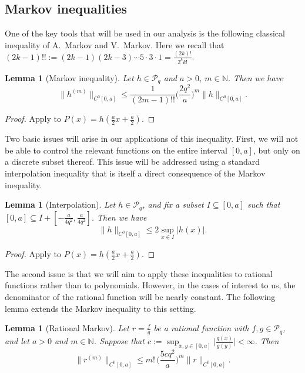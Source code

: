 \documentclass[10pt,reqno]{amsart}
\newtheorem{lem}[thm]{Lemma}
\theoremstyle{definition}
\theoremstyle{remark}
\numberwithin{equation}{section}
\numberwithin{figure}{section}
\numberwithin{table}{section}
\begin{document}
\subsection{Markov inequalities}

One of the key tools that will be used in our analysis is the following
classical inequality of A.\ Markov and V.\ Markov. Here we recall that
$(2k-1)!!:=(2k-1)(2k-3)\cdots 5\cdot 3\cdot 1 =\frac{(2k)!}{2^k k!}$.

\begin{lem}[Markov inequality]
\label{lem:markov}
Let $h\in\mathcal{P}_q$ and $a>0$, $m\in\mathbb{N}$. Then we have
$$
        \|h^{(m)}\|_{C^0[0,a]}
        \le \frac{1}{(2m-1)!!} 
        \bigg(\frac{2q^2}{a}\bigg)^m
	\|h\|_{C^0[0,a]}.
$$
\end{lem}

\begin{proof}
Apply \cite[p.\ 256(d)]{BE95} to
$P(x)=h(\frac{a}{2}x + \frac{a}{2})$.
\end{proof}

Two basic issues will arise in our applications of this inequality. First, 
we will not be able to control the relevant functions on the entire 
interval $[0,a]$, but only on a discrete subset thereof. This issue 
will be addressed using a standard interpolation inequality that is itself 
a direct consequence of the Markov inequality.

\begin{lem}[Interpolation]
\label{lem:interpol}
Let $h\in\mathcal{P}_q$, and fix a subset $I\subseteq[0,a]$ such that 
$[0,a]\subseteq I + [-\frac{a}{4q^2},\frac{a}{4q^2}]$. Then we have 
$$
        \|h\|_{C^0[0,a]} \le
        2\sup_{x\in I}|h(x)|.
$$
\end{lem}

\begin{proof}
Apply \cite[Lemma 3(i), p.\ 91]{Che98} to
$P(x)=h(\frac{a}{2}x + \frac{a}{2})$.
\end{proof}

The second issue is that we will aim to apply these inequalities to 
rational functions rather than to polynomials. However, in the cases of 
interest to us, the denominator of the rational function will be nearly 
constant. The following lemma extends the Markov inequality
to this setting.

\begin{lem}[Rational Markov]
\label{lem:rational}
Let $r=\frac{f}{g}$ be a rational function with $f,g\in\mathcal{P}_q$, 
and let $a>0$ and $m\in\mathbb{N}$. Suppose that 
$c:=\sup_{x,y\in[0,a]}\big|\frac{g(x)}{g(y)}\big|<\infty$. Then
$$
	\|r^{(m)}\|_{C^0[0,a]} \le
	m!\, \bigg(\frac{5cq^2}{a}\bigg)^m \|r\|_{C^0[0,a]}.
$$
\end{lem}
\end{document}

